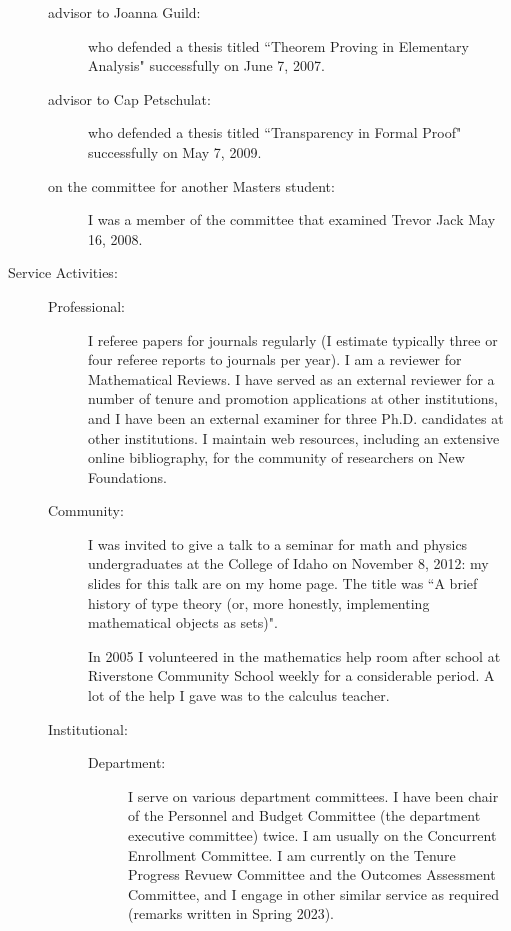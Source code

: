 \begin{description}
\begin{description}
\item[advisor to Joanna Guild:]  who defended a thesis titled ``Theorem Proving in Elementary Analysis" successfully on June 7, 2007.

\item[advisor to Cap Petschulat:]  who defended a thesis titled ``Transparency in Formal Proof" successfully on May 7, 2009.

\item[on the committee for another Masters student:]  I was a member of the committee that examined Trevor Jack  May 16, 2008.

\end{description}

\newpage

\item[Service Activities:]

\begin{description}

\item[]

\item[Professional:]  I referee papers for journals regularly (I estimate typically three or four referee reports to journals per year).  I am a reviewer for Mathematical Reviews.  I have served as an external reviewer for a number of tenure and promotion applications at other institutions, and I have been an external examiner for three Ph.D. candidates at other institutions.  I maintain web resources, including an extensive online bibliography, for the community of researchers on New Foundations.

\item[Community:]  I was invited to give a talk to a seminar for math and physics undergraduates at the College of Idaho on November 8, 2012:  my slides for this talk are on my home page.  The title was ``A brief history of type theory (or, more honestly, implementing mathematical objects as sets)".   

In 2005 I volunteered in the mathematics help room after school at Riverstone Community School weekly for a considerable period.  A lot of the help I gave was to the calculus teacher.

\item[Institutional:] 

\begin{description}

\item[]

\item[Department:]  I serve on various department committees.  I have been chair of the Personnel and Budget Committee (the department executive committee) twice.  I am usually on the Concurrent Enrollment Committee.  I am currently on the Tenure Progress Revuew Committee and the Outcomes Assessment Committee, and I engage in other similar service as required (remarks written in Spring 2023).


\end{description}
\end{description}
\end{description}
